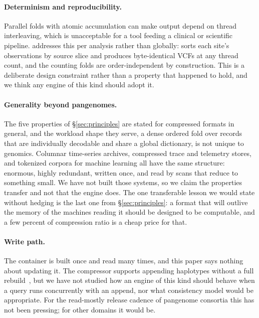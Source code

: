 \paragraph{Determinism and reproducibility.}
Parallel folds with atomic accumulation can make output depend on thread
interleaving, which is unacceptable for a tool feeding a clinical or scientific
pipeline. \sys addresses this per analysis rather than globally: 
sorts each site's observations by source slice and produces byte-identical VCFs at
any thread count, and the counting folds are order-independent by construction.
This is a deliberate design constraint rather than a property that happened to
hold, and we think any engine of this kind should adopt it.

\paragraph{Generality beyond pangenomes.}
The five properties of \S\ref{sec:principles} are stated for compressed formats in
general, and the workload shape they serve, a dense ordered fold over records that
are individually decodable and share a global dictionary, is not unique to
genomics. Columnar time-series archives, compressed trace and telemetry stores, and
tokenized corpora for machine learning all have the same structure: enormous,
highly redundant, written once, and read by scans that reduce to something small.
We have not built those systems, so we claim the properties transfer and not that
the engine does. The one transferable lesson we would state without hedging is the
last one from \S\ref{sec:principles}: a format that will outlive the memory of the
machines reading it should be designed to be computable, and a few percent of
compression ratio is a cheap price for that.

\paragraph{Write path.}
The container is built once and read many times, and this paper says nothing about
updating it. The compressor supports appending haplotypes without a full
rebuild~\cite{gfaz2026}, but we have not studied how an engine of this kind should
behave when a query runs concurrently with an append, nor what consistency model
would be appropriate. For the read-mostly release cadence of pangenome
consortia this has not been pressing; for other domains it would be.
